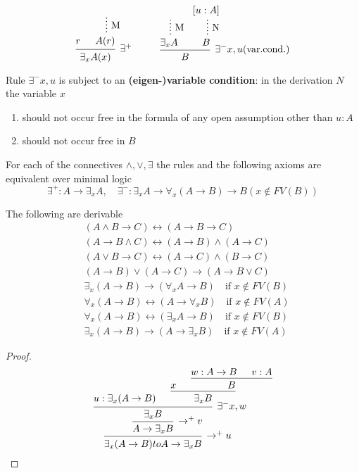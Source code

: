 \documentclass[11pt]{article}
\begin{document}
\begin{equation*}
\begin{prooftree}[center=false]
\hypo{r}
\hypo{}
\ellipsis{M}{A(r)}
\infer2[\(\exists^+\)]{\exists_xA(x)}
\end{prooftree}\hspace{1cm}
\begin{prooftree}[center=false]
\hypo{}
\ellipsis{M}{\exists_xA}
\hypo{[u:A]}
\ellipsis{N}{B}
\infer2[\(\exists^- x,u(\text{var.cond.})\)]{B}
\end{prooftree}
\end{equation*}

Rule \(\exists^-x,u\) is subject to an \textbf{(eigen-)variable condition}: in the
derivation \(N\) the variable \(x\)
\begin{enumerate}
\item should not occur free in the formula of any open assumption other than \(u:A\)
\item should not occur free in \(B\)
\end{enumerate}


For each of the connectives \(\wedge, \vee, \exists\) the rules and the
following axioms are equivalent over minimal logic
\begin{equation*}
\exists^+:A\to\exists_xA,\quad \exists^-:\exists_xA\to\forall_x(A\to B)\to B(x\not\in FV(B))
\end{equation*}

\begin{lemma}[]
The following are derivable
\begin{align*}
&(A\wedge B\to C)\leftrightarrow(A\to B\to C)\\
&(A\to B\wedge C)\leftrightarrow(A\to B)\wedge(A\to C)\\
&(A\vee B\to C)\leftrightarrow(A\to C)\wedge(B\to C)\\
&(A\to B)\vee(A\to C)\to (A\to B\vee C)\\
&\exists_x(A\to B)\to(\forall_xA\to B)\quad\text{if }x\not\in FV(B)\\
&\forall_x(A\to B)\leftrightarrow(A\to\forall_xB)\quad\text{if }x\not\in FV(A)\\
&\forall_x(A\to B)\leftrightarrow(\exists_xA\to B)\quad\text{if }x\not\in FV(B)\\
&\exists_x(A\to B)\to(A\to\exists_xB)\quad\text{if }x\not\in FV(A)
\end{align*}
\end{lemma}

\begin{proof}
\begin{equation*}
\begin{prooftree}[center=false]
\hypo{u:\exists_x(A\to B)}
\hypo{x}
\hypo{w:A\to B}\hypo{v:A}
\infer2{B}
\infer2{\exists_xB}
\infer2[\(\exists^-x,w\)]{\exists_xB}
\infer1[\(\to^+v\)]{A\to\exists_xB}
\infer1[\(\to^+u\)]{\exists_x(A\to B)to A\to\exists_xB}
\end{prooftree}
\end{equation*}
\end{proof}
\end{document}
